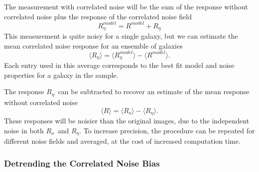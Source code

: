 \documentclass[usegraphicx,usenatbib]{mn2e}
\newcommand{\mcalR}{$R$}
\newcommand{\mcalRo}{$R_o$}
\newcommand{\mcalRnoise}{$R_\eta$}
\newcommand{\mcalRmodel}{$R^{model}$}
\newcommand{\mcalRnoisemodel}{$R^{model}_\eta$}
\begin{document}
The measurement with correlated noise will be the sum of the response
without correlated noise plus the response of the correlated noise field
\begin{equation}
    \mbox{\mcalRnoisemodel} = \mbox{\mcalRmodel} + \mbox{\mcalRnoise}
\end{equation}
This measurement is quite noisy for a single galaxy, but we
can estimate the mean correlated noise response for an ensemble
of galaxies
\begin{equation}
    \langle \mbox{\mcalRnoise} \rangle = \langle \mbox{\mcalRnoisemodel} \rangle - \langle \mbox{\mcalRmodel} \rangle.
\end{equation}
Each entry used in this average corresponds to the best fit model
and noise properties for a galaxy in the sample.

The response \mcalRnoise\ can be subtracted to recover an estimate of the mean
response without correlated noise
\begin{equation}
    \langle \mbox{\mcalR} \rangle = \langle \mbox{\mcalRo} \rangle - \langle \mbox{\mcalRnoise} \rangle.
\end{equation}
These responses will be noisier than the original images, due to the
independent noise in both \mcalRo\ and \mcalRnoise.  To increase
precision, the procedure can be repeated for different noise fields
and averaged, at the cost of increased computation time.

\subsubsection{Detrending the Correlated Noise Bias}
\end{document}
